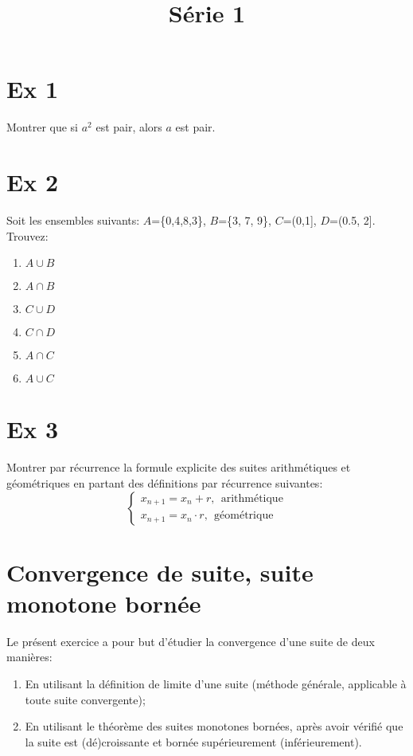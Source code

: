 \documentclass[a4paper, 12pt, french, twoside]{article}
\title{Série 1}
\begin{document}
\maketitle



\section{Ex 1}
Montrer que si $a^2$ est pair, alors $a$ est pair.

\section{Ex 2}
Soit les ensembles suivants: $A$=\{0,4,8,3\}, $B$=\{3, 7, 9\}, $C$=(0,1], $D$=(0.5, 2].
Trouvez:

\begin{enumerate}
    \item $A\cup B$
    \item $A \cap B$
    \item $C\cup D$
    \item $C\cap D$
    \item $A\cap C$
    \item $A\cup C$
\end{enumerate}

\section{Ex 3}
Montrer par récurrence la formule explicite des suites arithmétiques et géométriques en partant des définitions par récurrence suivantes:
\begin{equation}
    \begin{cases}
        x_{n+1}=x_n+r, ~~\text{arithmétique}\\
        x_{n+1}=x_n\cdot r, ~~\text{géométrique}
    \end{cases}
\end{equation}


\section{Convergence de suite, suite monotone bornée}
Le présent exercice a pour but d'étudier la convergence d'une suite de deux manières:
\begin{enumerate}
    \item En utilisant la définition de limite d'une suite (méthode générale, applicable à toute suite convergente);
    \item En utilisant le théorème des suites monotones bornées, après avoir vérifié que la suite est (dé)croissante et bornée supérieurement (inférieurement).
\end{enumerate}
\end{document}
